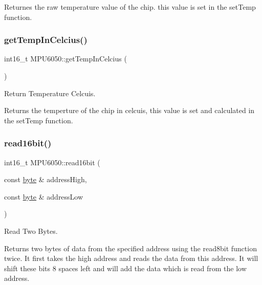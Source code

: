 Returnes the raw temperature value of the chip. this value is set in the set\+Temp function. \mbox{\label{class_m_p_u6050_aedd4952858c54d552041748abf6c68f5}} 
\subsubsection{\texorpdfstring{get\+Temp\+In\+Celcius()}{getTempInCelcius()}}
{\footnotesize\ttfamily int16\+\_\+t M\+P\+U6050\+::get\+Temp\+In\+Celcius (\begin{DoxyParamCaption}{ }\end{DoxyParamCaption})}



Return Temperature Celcuis. 

Returns the temperture of the chip in celcuis, this value is set and calculated in the set\+Temp function. \mbox{\label{class_m_p_u6050_a4636841f6b3432d8d45726fcdcdcfed8}} 
\subsubsection{\texorpdfstring{read16bit()}{read16bit()}}
{\footnotesize\ttfamily int16\+\_\+t M\+P\+U6050\+::read16bit (\begin{DoxyParamCaption}\item[{const \mbox{\hyperlink{_m_p_u6050_8hpp_a71809484a26cd96c6abe839a0a8a289d}{byte}} \&}]{address\+High,  }\item[{const \mbox{\hyperlink{_m_p_u6050_8hpp_a71809484a26cd96c6abe839a0a8a289d}{byte}} \&}]{address\+Low }\end{DoxyParamCaption})}



Read Two Bytes. 

Returns two bytes of data from the specified address using the read8bit function twice. It first takes the high address and reads the data from this address. It will shift these bits 8 spaces left and will add the data which is read from the low address. \mbox{\label{class_m_p_u6050_a8eb2aeeb0c15bc5f756fc5c5ba958332}} 
